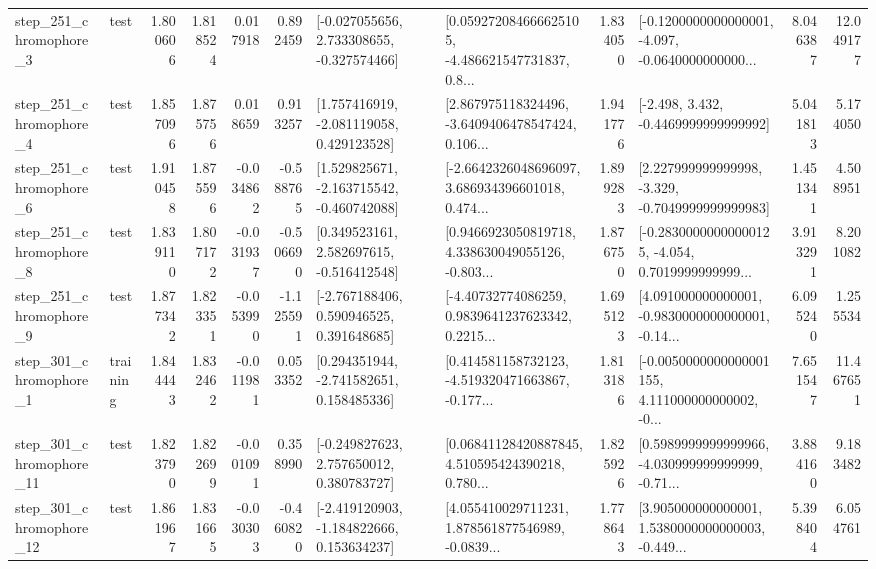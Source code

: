 \begin{tabular}{llrrrrllrlrr}
   step\_251\_chromophore\_3 &      test &      1.800606 &    1.818524 &      0.017918 &  0.892459 &   [-0.027055656, 2.733308655, -0.327574466] &  [0.059272084666625105, -4.486621547731837, 0.8... &       1.834050 &  [-0.1200000000000001, -4.097, -0.0640000000000... &            8.046387 &         12.049177 \\
   step\_251\_chromophore\_4 &      test &      1.857096 &    1.875756 &      0.018659 &  0.913257 &    [1.757416919, -2.081119058, 0.429123528] &  [2.867975118324496, -3.6409406478547424, 0.106... &       1.941776 &               [-2.498, 3.432, -0.4469999999999992] &            5.041813 &          5.174050 \\
   step\_251\_chromophore\_6 &      test &      1.910458 &    1.875596 &     -0.034862 & -0.588765 &   [1.529825671, -2.163715542, -0.460742088] &  [-2.6642326048696097, 3.686934396601018, 0.474... &       1.899283 &   [2.227999999999998, -3.329, -0.7049999999999983] &            1.451341 &          4.508951 \\
   step\_251\_chromophore\_8 &      test &      1.839110 &    1.807172 &     -0.031937 & -0.506690 &    [0.349523161, 2.582697615, -0.516412548] &  [0.9466923050819718, 4.338630049055126, -0.803... &       1.876750 &  [-0.28300000000000125, -4.054, 0.7019999999999... &            3.913291 &          8.201082 \\
   step\_251\_chromophore\_9 &      test &      1.877342 &    1.823351 &     -0.053990 & -1.125591 &    [-2.767188406, 0.590946525, 0.391648685] &  [-4.40732774086259, 0.9839641237623342, 0.2215... &       1.695123 &  [4.091000000000001, -0.9830000000000001, -0.14... &            6.095240 &          1.255534 \\
   step\_301\_chromophore\_1 &  training &      1.844443 &    1.832462 &     -0.011981 &  0.053352 &    [0.294351944, -2.741582651, 0.158485336] &  [0.414581158732123, -4.519320471663867, -0.177... &       1.813186 &  [-0.0050000000000001155, 4.111000000000002, -0... &            7.651547 &         11.467651 \\
  step\_301\_chromophore\_11 &      test &      1.823790 &    1.822699 &     -0.001091 &  0.358990 &    [-0.249827623, 2.757650012, 0.380783727] &  [0.06841128420887845, 4.510595424390218, 0.780... &       1.825926 &  [0.5989999999999966, -4.030999999999999, -0.71... &            3.884160 &          9.183482 \\
  step\_301\_chromophore\_12 &      test &      1.861967 &    1.831665 &     -0.030303 & -0.460820 &   [-2.419120903, -1.184822666, 0.153634237] &  [4.055410029711231, 1.878561877546989, -0.0839... &       1.778643 &  [3.905000000000001, 1.5380000000000003, -0.449... &            5.398404 &          6.054761 \\

\end{tabular}
